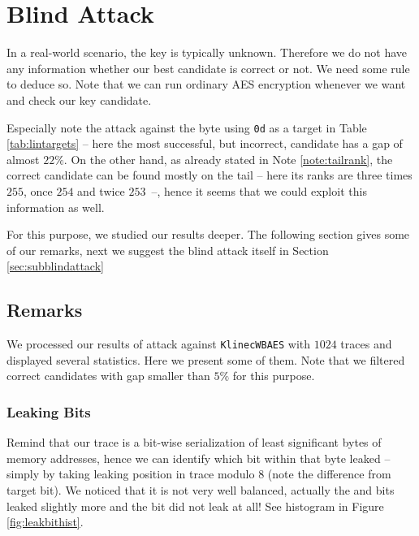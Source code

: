 \section{Blind Attack}
\label{sec:blindattack}

In a real-world scenario, the key is typically unknown. Therefore we do not have any information whether our best candidate is correct or not. We need some rule to deduce so. Note that we can run ordinary AES encryption whenever we want and check our key candidate.

\begin{remark}
\label{rem:tail}
	Especially note the attack against the  byte using {\tt 0d} as a target in Table \ref{tab:lintargets} -- here the most successful, but incorrect, candidate has a gap of almost $22\%$. On the other hand, as already stated in Note \ref{note:tailrank}, the correct candidate can be found mostly on the tail -- here its ranks are three times $255$, once $254$ and twice $253$~--, hence it seems that we could exploit this information as well.
\end{remark}

For this purpose, we studied our results deeper. The following section gives some of our remarks, next we suggest the blind attack itself in Section \ref{sec:subblindattack}



\subsection{Remarks}

We processed our results of attack against {\tt KlinecWBAES} with $1024$ traces and displayed several statistics. Here we present some of them. Note that we filtered correct candidates with gap smaller than $5\%$ for this purpose.

\subsubsection{Leaking Bits}
	
	Remind that our trace is a bit-wise serialization of least significant bytes of memory addresses, hence we can identify which bit within that byte leaked -- simply by taking leaking position in trace modulo $8$ (note the difference from target bit). We noticed that it is not very well balanced, actually the  and  bits leaked slightly more and the  bit did not leak at all! See histogram in Figure \ref{fig:leakbithist}. %
	

